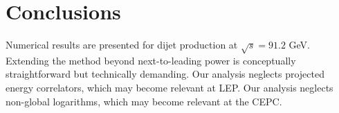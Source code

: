 \section{Conclusions}\label{sec:conclusions}

Numerical results are presented for dijet production at $\sqrt{s} =
91.2$ GeV. Extending the method beyond next-to-leading power is
conceptually straightforward but technically demanding. Our analysis
neglects projected energy correlators, which may become relevant at LEP.
Our analysis neglects non-global logarithms, which may become relevant
at the CEPC.


